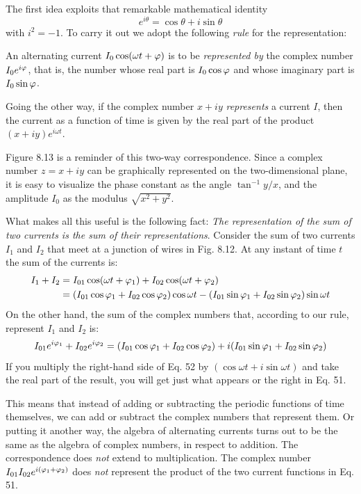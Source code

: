 The first idea exploits that remarkable mathematical identity
\begin{equation}
  e^{i\theta} = \cos\theta+i\sin\theta
\end{equation}
with $i^2 = -1$. To carry it out we adopt the following \emph{rule} for the
representation:

\begin{framed}
An alternating current $I_0 \cos (\omega t + \varphi)$ is to be \emph{represented
by} the complex number $I_0e^{i\varphi}$, that is, the number whose real
part is $I_0 \cos \varphi$ and whose imaginary part is $I_0 \sin \varphi$.

Going the other way, if the complex number $x + iy$ \emph{represents}
a current $I$, then the current as a function of time is given
by the real part of the product $(x + iy)e^{i\omega t}$.
\end{framed}

Figure 8.13 is a reminder of this two-way correspondence. Since
a complex number $z = x + iy$ can be graphically represented on the
two-dimensional plane, it is easy to visualize the phase constant as
the angle $\tan^{-1} y/x$, and the amplitude $I_0$ as the modulus
$\sqrt{x^2+y^2}$.

What makes all this useful is the following fact: \emph{The representation
of the sum of two currents is the sum of their representations}. Consider
the sum of two currents $I_1$ and $I_2$ that meet at a junction of wires in
Fig. 8.12. At any instant of time $t$ the sum of the currents is:
\begin{align}
\begin{split}
  I_1+I_2 &= I_{01}\cos(\omega t+\varphi_1) + I_{02}\cos(\omega t+\varphi_2) \\
          &=  (I_{01}\cos\varphi_1+I_{02}\cos\varphi_2)\cos\omega t
             -(I_{01}\sin\varphi_1+I_{02}\sin\varphi_2)\sin\omega t
\end{split}
\end{align}
On the other hand, the sum of the complex numbers that, according
to our rule, represent $I_1$ and $I_2$ is:
\begin{equation}
  I_{01}e^{i\varphi_1}+I_{02}e^{i\varphi_2}
   =  (I_{01}\cos\varphi_1+I_{02}\cos\varphi_2)
    +i(I_{01}\sin\varphi_1+I_{02}\sin\varphi_2)
\end{equation}
If you multiply the right-hand side of Eq. 52 by $(\cos \omega t + i \sin \omega t)$
and take the real part of the result, you will get just what appears or
the right in Eq. 51.

This means that instead of adding or subtracting the periodic functions
of time themselves, we can add or subtract the complex numbers
that represent them. Or putting it another way, the algebra of alternating
currents turns out to be the same as the algebra of complex
numbers, in respect to addition. The correspondence does \emph{not} extend
to multiplication. The complex number $I_{01}I_{02}e^{i(\varphi_1+\varphi_2)}$ does \emph{not}
represent the product of the two current functions in Eq. 51.

